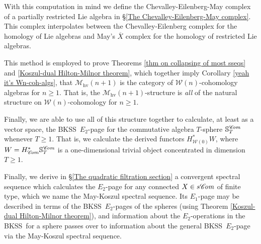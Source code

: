 \documentclass[11pt]{amsart} \renewcommand{\baselinestretch}{1.2}
\theoremstyle{plain}
\numberwithin{equation}{section} %
\theoremstyle{plain}
\numberwithin{equation}{chapter} %
\newcommand{\scrC}{\mathscr{C}}
\newcommand{\calW}{\mathcal{W}}
\newcommand{\calw}{\mathcal{W}}
\newcommand{\calu}{\mathcal{U}}
\newcommand{\calMhv}{\mathcal{M}_\mathrm{hv}}
\newcommand{\algs}{{\scrC\!\textit{\normalfont\textit{om}}}}
\newcommand{\BKSS}{BKSS}
\begin{document}
\begin{Introduction}
With this computation in mind we define the Chevalley-Eilenberg-May complex of a partially restricted Lie algebra in \S\ref{The Chevalley-Eilenberg-May complex}. This complex interpolates between the Chevalley-Eilenberg complex for the homology of Lie algebras and May's $\overline{X}$ complex \cite{MayRestLie.pdf} for the homology of restricted Lie algebras.

This method is employed to prove Theorems \ref{thm on collapsing of most sseqs} and \ref{Koszul-dual Hilton-Milnor theorem}, which together imply Corollary \ref{yeah it's Wn-coh-algs}, that $\calMhv(n+1)$ is the category of $\calw(n)$-cohomology algebras for $n\geq1$. That is, the $\calMhv(n+1)$-structure is \emph{all} of the natural structure on $\calW(n)$-cohomology for $n\geq1$.

Finally, we are able to use all of this structure together to calculate, at least as a vector space, the \BKSS\ $E_2$-page for the commutative algebra $T$-sphere $\mathbb{S}^{\algs}_T$ whenever $T\geq1$. That is, we calculate the derived functors $H^*_{\calw(0)}W$, where $W=H^*_{\algs}\mathbb{S}^{\algs}_T$ is a one-dimensional trivial object concentrated in dimension $T\geq1$.

Finally, we derive in \S\ref{The quadratic filtration section} a convergent spectral sequence which calculates the $E_2$-page for any connected $X\in s\algs$ of finite type, which we name the May-Koszul spectral sequence. Its $E_1$-page may be described in terms of the \BKSS\ $E_2$-pages of the spheres (using Theorem \ref{Koszul-dual Hilton-Milnor theorem}), and information about the $E_2$-operations in the \BKSS\ for a sphere passes over to information about the general \BKSS\ $E_2$-page via the May-Koszul spectral sequence.



\end{Introduction}
\end{document}
